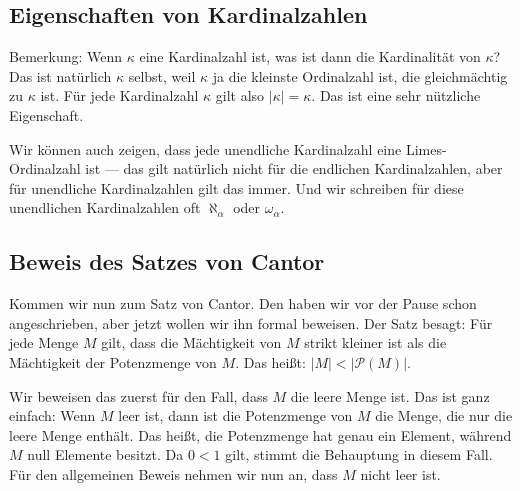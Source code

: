 \subsection{Eigenschaften von Kardinalzahlen}

\begin{spoken-clean}[00:57:32 - 00:59:25]
Bemerkung: Wenn $\kappa$ eine Kardinalzahl ist, was ist dann die Kardinalität von $\kappa$? Das ist natürlich $\kappa$ selbst, weil $\kappa$ ja die kleinste Ordinalzahl ist, die gleichmächtig zu $\kappa$ ist. Für jede Kardinalzahl $\kappa$ gilt also $|\kappa| = \kappa$. Das ist eine sehr nützliche Eigenschaft.

Wir können auch zeigen, dass jede unendliche Kardinalzahl eine Limes-Ordinalzahl ist \inlinemetanote{[Anmerkung: Denn andernfalls wäre sie von der Form $\kappa = \alpha + 1$, und für unendliche Mengen gilt $|\alpha + 1| = |\alpha|$, was der Eigenschaft $|\alpha| < |\kappa|$ einer Kardinalzahl widerspricht]} --- das gilt natürlich nicht für die endlichen Kardinalzahlen, aber für unendliche Kardinalzahlen gilt das immer. Und wir schreiben für diese unendlichen Kardinalzahlen oft $\aleph_\alpha$ oder $\omega_\alpha$.
\end{spoken-clean}

\begin{math-stroke}

\end{math-stroke}

\subsection{Beweis des Satzes von Cantor}

\begin{spoken-clean}[00:59:25 - 01:00:55]
Kommen wir nun zum Satz von Cantor. Den haben wir vor der Pause schon angeschrieben, aber jetzt wollen wir ihn formal beweisen. Der Satz besagt: Für jede Menge $M$ gilt, dass die Mächtigkeit von $M$ strikt kleiner ist als die Mächtigkeit der Potenzmenge von $M$. Das heißt: $|M| < |\mathcal{P}(M)|$.

Wir beweisen das zuerst für den Fall, dass $M$ die leere Menge ist. Das ist ganz einfach: Wenn $M$ leer ist, dann ist die Potenzmenge von $M$ die Menge, die nur die leere Menge enthält. Das heißt, die Potenzmenge hat genau ein Element, während $M$ null Elemente besitzt. Da $0 < 1$ gilt, stimmt die Behauptung in diesem Fall. Für den allgemeinen Beweis nehmen wir nun an, dass $M$ nicht leer ist.
\end{spoken-clean}

